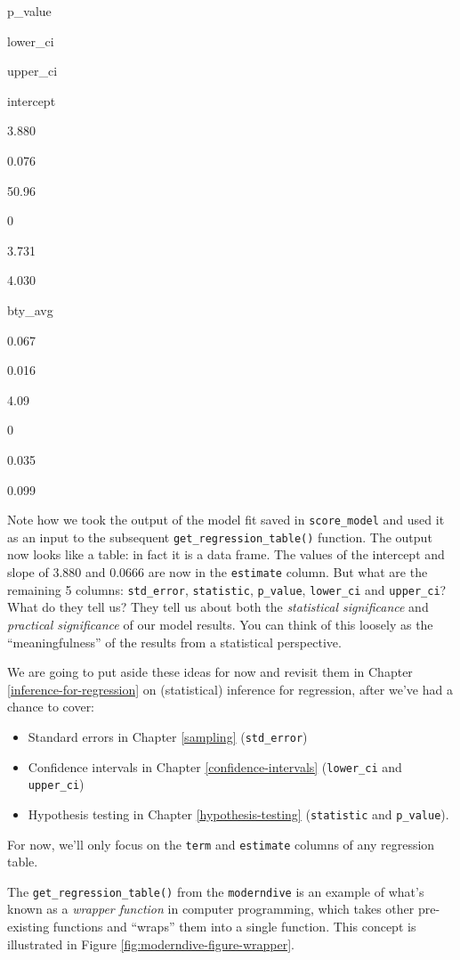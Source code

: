 \documentclass[12pt,]{krantz}
\providecommand{\tightlist}{%
  \setlength{\itemsep}{0pt}\setlength{\parskip}{0pt}}
\begin{document}
p\_value

lower\_ci

upper\_ci

intercept

3.880

0.076

50.96

0

3.731

4.030

bty\_avg

0.067

0.016

4.09

0

0.035

0.099

Note how we took the output of the model fit saved in
\texttt{score\_model} and used it as an input to the subsequent
\texttt{get\_regression\_table()} function. The output now looks like a
table: in fact it is a data frame. The values of the intercept and slope
of 3.880 and 0.0666 are now in the \texttt{estimate} column. But what
are the remaining 5 columns: \texttt{std\_error}, \texttt{statistic},
\texttt{p\_value}, \texttt{lower\_ci} and \texttt{upper\_ci}? What do
they tell us? They tell us about both the \emph{statistical
significance} and \emph{practical significance} of our model results.
You can think of this loosely as the ``meaningfulness'' of the results
from a statistical perspective.

We are going to put aside these ideas for now and revisit them in
Chapter \ref{inference-for-regression} on (statistical) inference for
regression, after we've had a chance to cover:

\begin{itemize}
\tightlist
\item
  Standard errors in Chapter \ref{sampling} (\texttt{std\_error})
\item
  Confidence intervals in Chapter \ref{confidence-intervals}
  (\texttt{lower\_ci} and \texttt{upper\_ci})
\item
  Hypothesis testing in Chapter \ref{hypothesis-testing}
  (\texttt{statistic} and \texttt{p\_value}).
\end{itemize}

For now, we'll only focus on the \texttt{term} and \texttt{estimate}
columns of any regression table.

The \texttt{get\_regression\_table()} from the \texttt{moderndive} is an
example of what's known as a \emph{wrapper function} in computer
programming, which takes other pre-existing functions and ``wraps'' them
into a single function. This concept is illustrated in Figure
\ref{fig:moderndive-figure-wrapper}.
\end{document}
